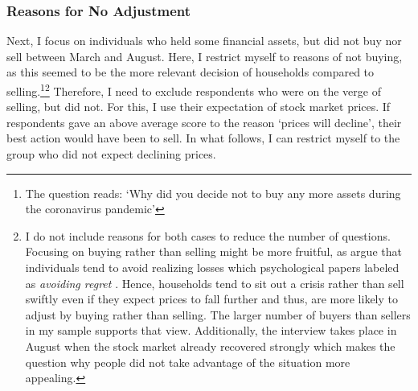 \documentclass[ProjectABM]{subfiles}
\begin{document}
\subsubsection{Reasons for No Adjustment}
Next, I focus on individuals who held some financial assets, but did not buy nor sell between March and August. Here, I restrict myself to reasons of not buying, as this seemed to be the more relevant decision of households compared to selling.\footnote{The question reads: `Why did you decide not to buy any more assets during the coronavirus pandemic'}\footnote{I do not include reasons for both cases to reduce the number of questions. Focusing on buying rather than selling might be more fruitful, as \cite{Kahneman_Tversky1979_Prospect} argue that individuals tend to avoid realizing losses which psychological papers labeled as \textit{avoiding regret} \citep{anderson2003_psychology}. Hence, households tend to sit out a crisis rather than sell swiftly even if they expect prices to fall further and thus, are more likely to adjust by buying rather than selling. The larger number of buyers than sellers in my sample supports that view. Additionally, the interview takes place in August when the stock market already recovered strongly which makes the question why people did not take advantage of the situation more appealing.} 
Therefore, I need to exclude respondents who were on the verge of selling, but did not. For this, I use their expectation of stock market prices. If respondents gave an above average score to the reason `prices will decline', their best action would have been to sell. In what follows, I can restrict myself to the group who did not expect declining prices. 


%
\end{document}
